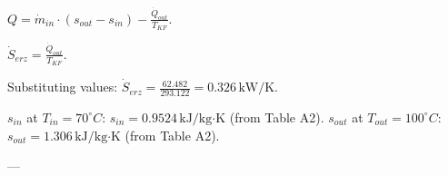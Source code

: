 \( Q = \dot{m}_{in} \cdot (s_{out} - s_{in}) - \frac{\dot{Q}_{out}}{T_{KF}} \).  

\( \dot{S}_{erz} = \frac{\dot{Q}_{out}}{T_{KF}} \).  

Substituting values:  
\( \dot{S}_{erz} = \frac{62.482}{293.122} = 0.326 \, \text{kW/K} \).  

\( s_{in} \) at \( T_{in} = 70^\circ C \): \( s_{in} = 0.9524 \, \text{kJ/kg·K} \) (from Table A2).  
\( s_{out} \) at \( T_{out} = 100^\circ C \): \( s_{out} = 1.306 \, \text{kJ/kg·K} \) (from Table A2).  

---